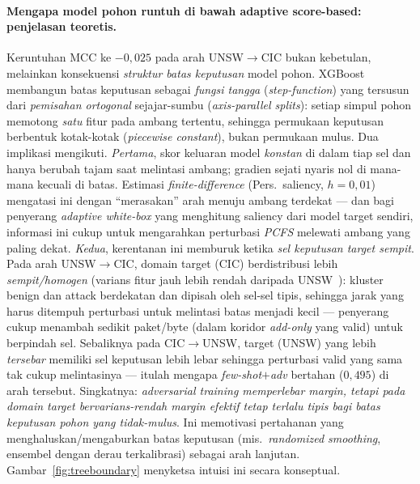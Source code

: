 \documentclass[11pt,a4paper]{article}
\begin{document}
\paragraph{Mengapa model pohon runtuh di bawah adaptive score-based: penjelasan
teoretis.} Keruntuhan MCC ke $-0{,}025$ pada arah UNSW$\rightarrow$CIC bukan
kebetulan, melainkan konsekuensi \emph{struktur batas keputusan} model pohon.
XGBoost membangun batas keputusan sebagai \emph{fungsi tangga}
(\emph{step-function}) yang tersusun dari \emph{pemisahan ortogonal} sejajar-sumbu
(\emph{axis-parallel splits}): setiap simpul pohon memotong \emph{satu} fitur pada
ambang tertentu, sehingga permukaan keputusan berbentuk kotak-kotak (\emph{piecewise
constant}), bukan permukaan mulus. Dua implikasi mengikuti. \emph{Pertama},
skor keluaran model \emph{konstan} di dalam tiap sel dan hanya berubah tajam saat
melintasi ambang; gradien sejati nyaris nol di mana-mana kecuali di batas. Estimasi
\emph{finite-difference} (Pers.~saliency, $h=0{,}01$) mengatasi ini dengan
``merasakan'' arah menuju ambang terdekat --- dan bagi penyerang \emph{adaptive
white-box} yang menghitung saliency dari model target sendiri, informasi ini cukup
untuk mengarahkan perturbasi \emph{PCFS} melewati ambang yang
paling dekat. \emph{Kedua}, kerentanan ini memburuk ketika \emph{sel keputusan
target sempit}. Pada arah UNSW$\rightarrow$CIC, domain target (CIC) berdistribusi
lebih \emph{sempit/homogen} (varians fitur jauh lebih rendah daripada
UNSW~\cite{martono2024sfm}): kluster benign dan attack berdekatan dan dipisah oleh sel-sel tipis,
sehingga jarak yang harus ditempuh perturbasi untuk melintasi batas menjadi kecil
--- penyerang cukup menambah sedikit paket/byte (dalam koridor \emph{add-only} yang
valid) untuk berpindah sel. Sebaliknya pada CIC$\rightarrow$UNSW, target (UNSW) yang
lebih \emph{tersebar} memiliki sel keputusan lebih lebar sehingga perturbasi valid
yang sama tak cukup melintasinya --- itulah mengapa \emph{few-shot$+$adv} bertahan
($0{,}495$) di arah tersebut. Singkatnya: \emph{adversarial training memperlebar
margin, tetapi pada domain target bervarians-rendah margin efektif tetap terlalu
tipis bagi batas keputusan pohon yang tidak-mulus}. Ini memotivasi pertahanan yang
menghaluskan/mengaburkan batas keputusan (mis.\ \emph{randomized smoothing},
ensembel dengan derau terkalibrasi) sebagai arah lanjutan.
Gambar~\ref{fig:treeboundary} menyketsa intuisi ini secara konseptual.
\end{document}
